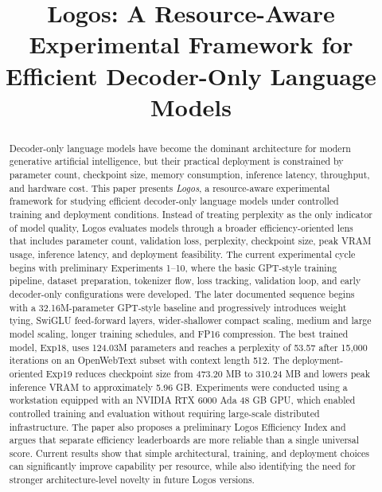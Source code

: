 \documentclass[conference]{IEEEtran}
\begin{document}
\title{Logos: A Resource-Aware Experimental Framework for Efficient Decoder-Only Language Models}

\author{
}

\maketitle

\begin{abstract}
Decoder-only language models have become the dominant architecture for modern generative artificial intelligence, but their practical deployment is constrained by parameter count, checkpoint size, memory consumption, inference latency, throughput, and hardware cost. This paper presents \textit{Logos}, a resource-aware experimental framework for studying efficient decoder-only language models under controlled training and deployment conditions. Instead of treating perplexity as the only indicator of model quality, Logos evaluates models through a broader efficiency-oriented lens that includes parameter count, validation loss, perplexity, checkpoint size, peak VRAM usage, inference latency, and deployment feasibility. The current experimental cycle begins with preliminary Experiments 1--10, where the basic GPT-style training pipeline, dataset preparation, tokenizer flow, loss tracking, validation loop, and early decoder-only configurations were developed. The later documented sequence begins with a 32.16M-parameter GPT-style baseline and progressively introduces weight tying, SwiGLU feed-forward layers, wider-shallower compact scaling, medium and large model scaling, longer training schedules, and FP16 compression. The best trained model, Exp18, uses 124.03M parameters and reaches a perplexity of 53.57 after 15,000 iterations on an OpenWebText subset with context length 512. The deployment-oriented Exp19 reduces checkpoint size from 473.20 MB to 310.24 MB and lowers peak inference VRAM to approximately 5.96 GB. Experiments were conducted using a workstation equipped with an NVIDIA RTX 6000 Ada 48 GB GPU, which enabled controlled training and evaluation without requiring large-scale distributed infrastructure. The paper also proposes a preliminary Logos Efficiency Index and argues that separate efficiency leaderboards are more reliable than a single universal score. Current results show that simple architectural, training, and deployment choices can significantly improve capability per resource, while also identifying the need for stronger architecture-level novelty in future Logos versions.
\end{abstract}
\end{document}
